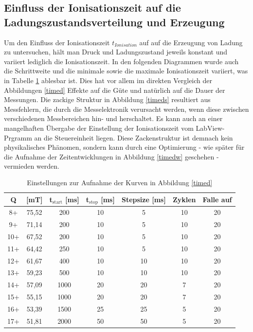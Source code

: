 	\subsection{Einfluss der Ionisationszeit auf die Ladungszustandsverteilung und Erzeugung}
        Um den Einfluss der Ionisationszeit $t_{Ionisation}$ auf auf die Erzeugung von Ladung zu untersuchen, hält man Druck und Ladungszustand jeweils konstant und variiert lediglich die Ionisationszeit. In den folgenden Diagrammen wurde auch die Schrittweite und die minimale sowie die maximale Ionisationszeit variiert, was in Tabelle \ref{zeit} ablesbar ist. Dies hat vor allem im direkten Vergleich der Abbildungen \ref{timed} Effekte auf die Güte und natürlich auf die Dauer der Messungen. Die zackige Struktur in Abbildung \ref{timeds} resultiert aus Messfehlern, die durch die Messelektronik verursacht werden, wenn diese zwischen verschiedenen Messbereichen hin- und herschaltet. Es kann auch an einer mangelhaften Übergabe der Einstellung der Ionisationszeit vom LabView-Prgramm an die Steuereinheit liegen. Diese Zackenstruktur ist demnach kein physikalisches Phänomen, sondern kann durch eine Optimierung - wie später für die Aufnahme der Zeitentwicklungen in Abbildung \ref{timedw} geschehen - vermieden werden.
        \begin{table}
                    \begin{tabular}{c|c|c|c|c|c|c}
                            \textbf{Q} & \label{B} [mT] & \textbf{t$_\text{start}$} [ms] & \textbf{t$_\text{stop}$} [ms] & \textbf{Stepsize} [ms] & \textbf{Zyklen} & \textbf{Falle auf} \\ 
                    \hline 8+ & 75,52 & 200 & 10 & 5 & 10 & 20 \\ 
                           9+ & 71,14 & 200 & 10 & 5 & 10 & 20 \\ 
                          10+ & 67,52 & 200 & 10 & 5 & 10 & 20 \\ 
                          11+ & 64,42 & 250 & 10 & 5 & 10 & 20 \\ 
                          12+ & 61,67 & 400 & 10 & 10 & 10 & 20 \\ 
                          13+ & 59,23 & 500 & 10 & 10 & 10 & 20 \\ 
                          14+ & 57,09 & 1000 & 20 & 20 & 7 & 20 \\ 
                          15+ & 55,15 & 1000 & 20 & 20 & 7 & 20 \\ 
                          16+ & 53,39 & 1500 & 25 & 25 & 5 & 20 \\ 
                          17+ & 51,81 & 2000 & 50 & 50 & 5 & 20
                \end{tabular} 
                \caption{Einstellungen zur Aufnahme der Kurven in Abbildung \ref{timed}}      
                \label{zeit}
        \end{table}
